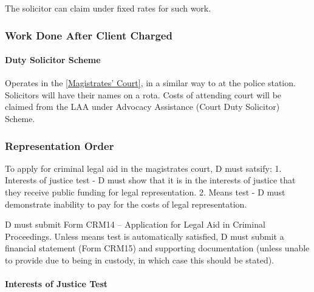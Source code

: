 \documentclass[
]{article}
\newenvironment{Shaded}{}{}
\newcommand{\NormalTok}[1]{#1}
\begin{document}
The solicitor can claim under fixed rates for such work.

\hypertarget{work-done-after-client-charged}{%
\subsubsection{Work Done After Client
Charged}\label{work-done-after-client-charged}}

\hypertarget{duty-solicitor-scheme}{%
\paragraph{Duty Solicitor Scheme}\label{duty-solicitor-scheme}}

Operates in the
\href{maximum\%20compensation\%20of\%20£5,000\%20per\%20offence}{{[}Magistrates'
Court{]}}, in a similar way to at the police station. Solicitors will
have their names on a rota. Costs of attending court will be claimed
from the LAA under Advocacy Assistance (Court Duty Solicitor) Scheme.

\hypertarget{representation-order}{%
\subsubsection{Representation Order}\label{representation-order}}

\begin{Shaded}
\begin{Highlighting}[]
\NormalTok{To apply for criminal legal aid in the magistrates\textquotesingle{} court, D must satsify:}
\NormalTok{1. Interests of justice test {-} D must show that it is in the interests of justice that they receive public funding for legal representation. }
\NormalTok{2. Means test {-} D must demonstrate inability to pay for the costs of legal representation. }
\end{Highlighting}
\end{Shaded}

D must submit Form CRM14 -- Application for Legal Aid in Criminal
Proceedings. Unless means test is automatically satisfied, D must submit
a financial statement (Form CRM15) and supporting documentation (unless
unable to provide due to being in custody, in which case this should be
stated).

\hypertarget{interests-of-justice-test}{%
\paragraph{Interests of Justice Test}\label{interests-of-justice-test}}
\end{document}
